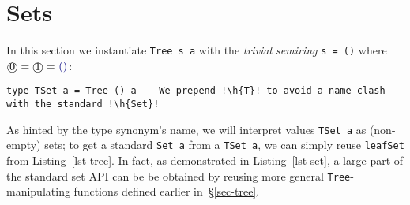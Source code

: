 \documentclass[english,submission]{programming}
\newcommand{\hcode}[1]{{\color{darkblue} \lstinline[keywordstyle={}]|#1|}} %
\newcommand{\h}[1]{{\itshape\color{grayblue}#1}} %
\newcommand{\zero}{\raisebox{-0.2mm}{\textcircled{0}}\xspace}
\newcommand{\one}{\raisebox{-0.2mm}{\textcircled{1}}\xspace}
\begin{document}
\section{Sets}\label{sec-set}

In this section we instantiate \hcode{Tree s a} with the \emph{trivial semiring}
\hcode{s = ()} where $\zero = \one = \text{\hcode{()}}$:

\begin{lstlisting}
type TSet a = Tree () a -- We prepend !\h{T}! to avoid a name clash with the standard !\h{Set}!
\end{lstlisting}

\noindent
As hinted by the type synonym's name, we will interpret values \hcode{TSet a} as
(non-empty) sets; to get a standard \hcode{Set a} from a \hcode{TSet a}, we can
simply reuse \hcode{leafSet} from Listing~\ref{lst-tree}.
In fact, as demonstrated in Listing~\ref{lst-set}, a large part of the standard
set API can be be obtained by reusing more general \hcode{Tree}-manipulating
functions defined earlier in~\S\ref{sec-tree}.
\end{document}
